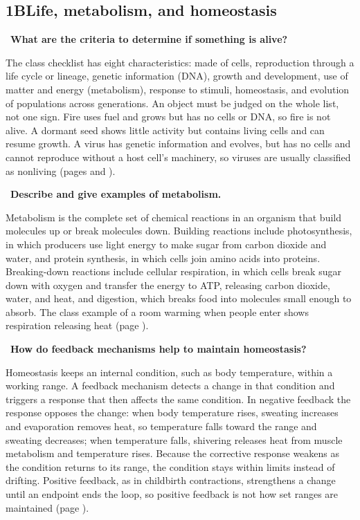 \documentclass[11pt,letterpaper]{article}
\newcommand{\sq}[1]{\par\Needspace{6\baselineskip}\medskip{\color{forest}\textbf{Q.}}\ \textbf{#1}\par\smallskip}
\newcommand{\ans}[1]{#1\par}
\begin{document}
\subsection*{1B\quad Life, metabolism, and homeostasis}
\sq{What are the criteria to determine if something is alive?}
\ans{The class checklist has eight characteristics: made of cells, reproduction through a life cycle or lineage, genetic information (DNA), growth and development, use of matter and energy (metabolism), response to stimuli, homeostasis, and evolution of populations across generations. An object must be judged on the whole list, not one sign. Fire uses fuel and grows but has no cells or DNA, so fire is not alive. A dormant seed shows little activity but contains living cells and can resume growth. A virus has genetic information and evolves, but has no cells and cannot reproduce without a host cell's machinery, so viruses are usually classified as nonliving (pages \pageref{lifecheck} and \pageref{cells}).}
\sq{Describe and give examples of metabolism.}
\ans{Metabolism is the complete set of chemical reactions in an organism that build molecules up or break molecules down. Building reactions include photosynthesis, in which producers use light energy to make sugar from carbon dioxide and water, and protein synthesis, in which cells join amino acids into proteins. Breaking-down reactions include cellular respiration, in which cells break sugar down with oxygen and transfer the energy to ATP, releasing carbon dioxide, water, and heat, and digestion, which breaks food into molecules small enough to absorb. The class example of a room warming when people enter shows respiration releasing heat (page \pageref{oneb}).}
\sq{How do feedback mechanisms help to maintain homeostasis?}
\ans{Homeostasis keeps an internal condition, such as body temperature, within a working range. A feedback mechanism detects a change in that condition and triggers a response that then affects the same condition. In negative feedback the response opposes the change: when body temperature rises, sweating increases and evaporation removes heat, so temperature falls toward the range and sweating decreases; when temperature falls, shivering releases heat from muscle metabolism and temperature rises. Because the corrective response weakens as the condition returns to its range, the condition stays within limits instead of drifting. Positive feedback, as in childbirth contractions, strengthens a change until an endpoint ends the loop, so positive feedback is not how set ranges are maintained (page \pageref{feedback}).}
\end{document}
